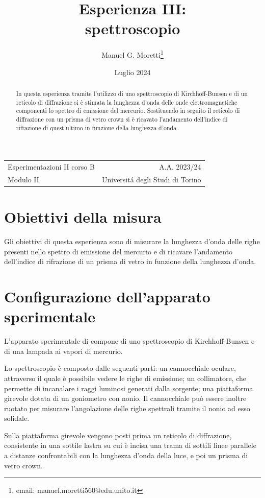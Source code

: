 \documentclass{article}
\title{Esperienza III: \\ spettroscopio}
\author{Manuel G. Moretti\footnote{email: manuel.moretti560@edu.unito.it}}
\date{Luglio 2024}
\begin{document}
\maketitle

\begin{center}
\begin{tabular}{l r}
Esperimentazioni II corso B & A.A. 2023/24 \\
Modulo II & Universit\'{a} degli Studi di Torino \\
\end{tabular}
\end{center}

\begin{abstract}
In questa esperienza tramite l'utilizzo di uno spettroscopio di Kirchhoff-Bunsen e di un reticolo di diffrazione si è stimata la lunghezza d'onda delle onde elettromagnetiche componenti lo spettro di emissione del mercurio. Sostituendo in seguito il reticolo di diffrazione con un prisma di vetro crown si è ricavato l'andamento dell'indice di rifrazione di quest'ultimo in funzione della lunghezza d'onda.
\end{abstract}

\section{Obiettivi della misura}
Gli obiettivi di questa esperienza sono di misurare la lunghezza d'onda delle righe presenti nello spettro di emissione del mercurio e di ricavare l'andamento dell'indice di rifrazione di un prisma di vetro in funzione della lunghezza d'onda.

\section{Configurazione dell'apparato sperimentale}
L'apparato sperimentale di compone di uno spettroscopio di Kirchhoff-Bunsen e di una lampada ai vapori di mercurio. 

Lo spettroscopio è composto dalle seguenti parti: un cannocchiale oculare, attraverso il quale è possibile vedere le righe di emissione; un collimatore, che permette di incanalare i raggi luminosi generati dalla sorgente; una piattaforma girevole dotata di un goniometro con nonio. Il cannocchiale può essere inoltre ruotato per misurare l'angolazione delle righe spettrali tramite il nonio ad esso solidale.

Sulla piattaforma girevole vengono posti prima un reticolo di diffrazione, consistente in una sottile lastra su cui è incisa una trama di sottili linee parallele a distanze confrontabili con la lunghezza d'onda della luce, e poi un prisma di vetro crown.
\end{document}
